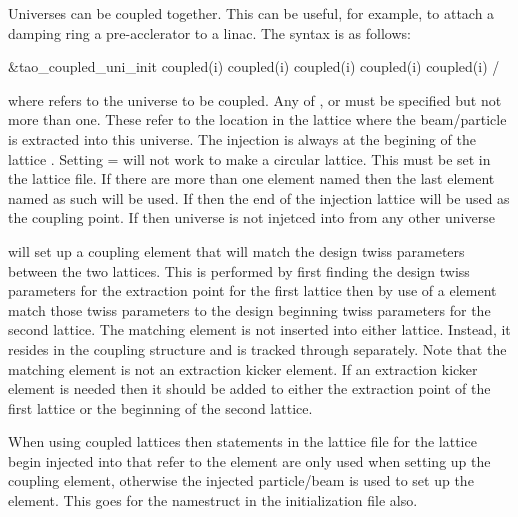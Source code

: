 Universes can be coupled together. This can be useful, for example, to attach a
damping ring a pre-acclerator to a linac. The syntax is as follows:
\begin{example}
  &tao_coupled_uni_init
    coupled(i)%
    coupled(i)%
    coupled(i)%
    coupled(i)%
    coupled(i)%
  /
\end{example}
where  refers to the universe to be coupled. Any of ,
 or
 must be specified but not more than one. These refer to the location in the
lattice where the beam/particle is extracted into this universe. 
The injection is always at the begining of
the lattice . Setting  = 
will not work to make a circular lattice. This must be set in the lattice file.
If there are more than one element named  then the last element
named as such will be used. If  then the end of the injection 
lattice will be used as
the coupling point. If  then universe  is not
injetced into from any other universe

 will set up a coupling element that will match the design twiss
parameters between the two lattices. This is performed by first finding the
design twiss parameters for the extraction point for the first lattice then by
use of a \bmad {} element match those twiss parameters to the design
beginning twiss parameters for the second lattice. The matching element is not
inserted into either lattice. Instead, it resides in the \tao coupling structure and
is tracked through separately. Note that the matching element is not an
extraction kicker element. If an extraction kicker element is needed then it
should be added to either the extraction point of the first lattice or the
beginning of the second lattice.

When using coupled lattices then statements in the lattice file for the lattice
begin injected into that refer to the  element are only used when setting
up the coupling element, otherwise the injected particle/beam is used to set up
the  element. This goes for the  namestruct in
the initialization file also.

